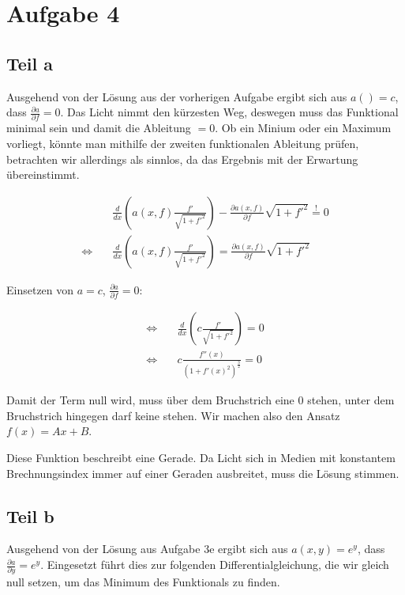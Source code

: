 \documentclass[a4paper,german,12pt,smallheadings]{scrartcl}
\begin{document}
\section*{Aufgabe 4}
\subsection*{Teil a}

Ausgehend von der Lösung aus der vorherigen Aufgabe ergibt sich aus $a() = c$,
dass $\frac{\partial a}{\partial f} = 0$. Das Licht nimmt den kürzesten Weg,
deswegen muss das Funktional minimal sein und damit die Ableitung $=0$. Ob ein
Minium oder ein Maximum vorliegt, könnte man mithilfe der zweiten funktionalen
Ableitung prüfen, betrachten wir allerdings als sinnlos, da das Ergebnis mit
der Erwartung übereinstimmt.

\begin{align*}
  &\frac{d}{dx} \left(a(x,f) \frac{f'}{\sqrt{1+f'^2}} \right) - \frac{\partial a(x,f)}{\partial f} \sqrt{1+f'^2} \overset{!}{=} 0 \\
  \Leftrightarrow \quad &\frac{d}{dx} \left(a(x,f) \frac{f'}{\sqrt{1+f'^2}} \right) = \frac{\partial a(x,f)}{\partial f} \sqrt{1+f'^2}
\end{align*}

Einsetzen von $a = c$, $\frac{\partial a}{\partial f} = 0$:

\begin{align*}
  \Leftrightarrow \quad &\frac{d}{dx} \left(c \frac{f'}{\sqrt{1+f'^2}} \right) = 0 \\
  \Leftrightarrow \quad &c \frac{f''(x)}{\left(1 + f'(x)^2\right)^{\frac{3}{2}}} = 0
\end{align*}

Damit der Term null wird, muss über dem Bruchstrich eine $0$ stehen, unter dem
Bruchstrich hingegen darf keine stehen. Wir machen also den Ansatz $f(x) =
Ax+B$.

Diese Funktion beschreibt eine Gerade. Da Licht sich in Medien mit konstantem
Brechnungsindex immer auf einer Geraden ausbreitet, muss die Lösung stimmen.

\subsection*{Teil b}

Ausgehend von der Lösung aus Aufgabe 3e ergibt sich aus $a(x,y) = e^y$, dass
$\frac{\partial a}{\partial y} = e^y$. Eingesetzt führt dies zur
folgenden Differentialgleichung, die wir gleich null setzen, um das Minimum des
Funktionals zu finden.
\end{document}
